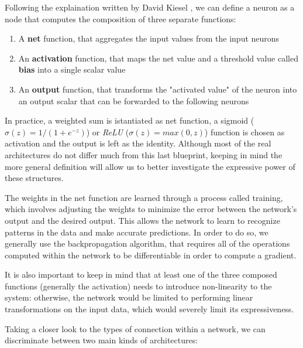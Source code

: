 \documentclass{article}
\begin{document}
Following the explaination written by David Kiesel \cite{KRI07}, we can define a neuron as a node that computes the composition of three separate functions:

\begin{enumerate}
    \item A \textbf{net} function, that aggregates the input values from the input neurons
    \item An \textbf{activation} function, that maps the net value and a threshold value called \textbf{bias} into a single scalar value
    \item An \textbf{output} function, that transforms the "activated value" of the neuron into an output scalar that can be forwarded to the following neurons
\end{enumerate}

In practice, a weighted sum is istantiated as net function, a sigmoid ($\sigma(z)=1/(1+e^{-z})$) or \textit{ReLU} ($\sigma(z) = max(0,z)$) function is chosen as activation and the output is left as the identity. Although most of the real architectures do not differ much from this last blueprint, keeping in mind the more general definition will allow us to better investigate the expressive power of these structures.

The weights in the net function are learned through a process called training, which involves adjusting the weights to minimize the error between the network's output and the desired output. This allows the network to learn to recognize patterns in the data and make accurate predictions. In order to do so, we generally use the backpropagation algorithm, that requires all of the operations computed within the network to be differentiable in order to compute a gradient.

It is also important to keep in mind that at least one of the three composed functions (generally the activation) needs to introduce non-linearity to the system: otherwise, the network would be limited to performing linear transformations on the input data, which would severely limit its expressiveness.

Taking a closer look to the types of connection within a network, we can discriminate between two main kinds of architectures:
\end{document}
